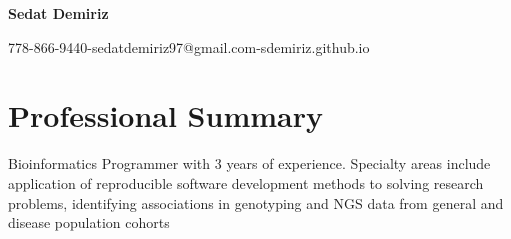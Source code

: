 \documentclass{article}
\makeatletter
\newcommand{\name}{Sedat Demiriz}
\newcommand{\email}{sedatdemiriz97@gmail.com}
\newcommand{\phone}{778-866-9440}
\newcommand{\website}{sdemiriz.github.io}
\makeatother
\begin{document}
\begin{minipage}[t]{1\textwidth} 
  \centering \Huge 
  \textbf{\name} \vspace{.5em} 
\end{minipage}
\begin{minipage}[t]{1\textwidth} 
  \centering \normalsize 
  \phone\hspace{0.5em}-\hspace{0.5em}\email\hspace{0.5em}-\hspace{0.5em}\website
\end{minipage}

\section*{Professional Summary} \vspace{-1em} \hrulefill \vspace{.5em}

\noindent Bioinformatics Programmer with 3 years of experience. Specialty areas include application of reproducible
software development methods to solving research problems, identifying associations in genotyping and NGS data from 
general and disease population cohorts
\end{document}

